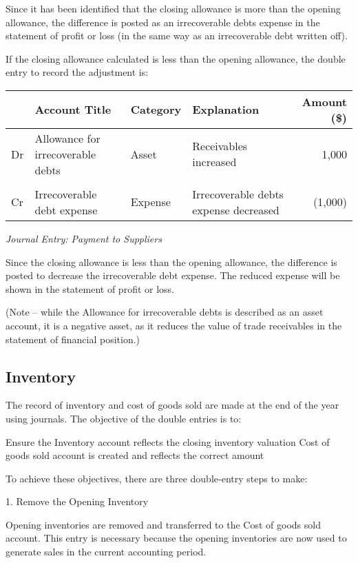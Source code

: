 Since it has been identified that the closing allowance is more than the opening allowance, the difference is posted as an irrecoverable debts expense in the statement of profit or loss (in the same way as an irrecoverable debt written off). 

If the closing allowance calculated is less than the opening allowance, the double entry to record the adjustment is: 


\begin{center} 
\begin{tabular}{@{} l l l l r @{}}
\toprule
& \textbf{Account Title} & \textbf{Category} & \textbf{Explanation} & \textbf{Amount (\$)} \\
\midrule
Dr & Allowance for irrecoverable debts & Asset & Receivables increased & 1,000 \\
 & \quad  & \\
Cr & Irrecoverable debt expense & Expense & Irrecoverable debts expense decreased & (1,000) \\
\bottomrule
\end{tabular}
\end{center}
\vspace{1em}
\textit{Journal Entry: Payment to Suppliers}

Since the closing allowance is less than the opening allowance, the difference is posted to decrease the irrecoverable debt expense. The reduced expense will be shown in the statement of profit or loss.

(Note – while the Allowance for irrecoverable debts is described as an asset account, it is a negative asset, as it reduces the value of trade receivables in the statement of financial position.)

\subsection{Inventory} 

The record of inventory and cost of goods sold are made at the end of the year using journals. The objective of the double entries is to:

    Ensure the Inventory account reflects the closing inventory valuation
    Cost of goods sold account is created and reflects the correct amount

To achieve these objectives, there are three double-entry steps to make:

1. Remove the Opening Inventory

Opening inventories are removed and transferred to the Cost of goods sold account. This entry is necessary because the opening inventories are now used to generate sales in the current accounting period.

